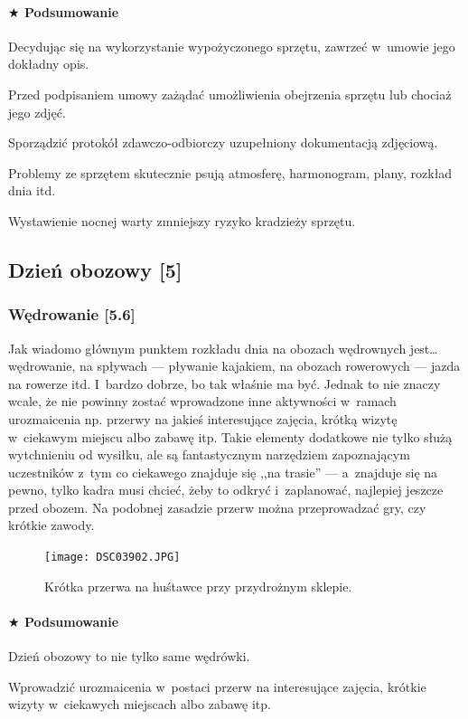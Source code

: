 \documentclass[a5paper,10pt,titlepage,twoside]{article}
\newcommand*{\thecheckbox}{\hss$\Box$} %
\newenvironment*{checklist}
{\list{}{%
\renewcommand*{\makelabel}[1]{\thecheckbox}}}
{\endlist}
\begin{document}
\paragraph{$\bigstar$ Podsumowanie}
\begin{checklist}
\item Decydując się na wykorzystanie wypożyczonego sprzętu, zawrzeć w~umowie jego dokładny opis.
\item Przed podpisaniem umowy zażądać umożliwienia obejrzenia sprzętu lub chociaż jego zdjęć.
\item Sporządzić protokół zdawczo-odbiorczy uzupełniony dokumentacją zdjęciową.
\item Problemy ze sprzętem skutecznie psują atmosferę, harmonogram, plany, rozkład dnia itd.
\item Wystawienie nocnej warty zmniejszy ryzyko kradzieży sprzętu.
\end{checklist}

\subsection{Dzień obozowy [5]}
\subsubsection{Wędrowanie [5.6]}
Jak wiadomo głównym punktem rozkładu dnia na obozach wędrownych jest\ldots węd\-rowanie, na spływach --- pływanie kajakiem, na obozach rowerowych --- jazda na rowerze itd. I~bardzo dobrze, bo tak właśnie ma być. Jednak to nie znaczy wcale, że nie powinny zostać wprowadzone inne aktywności w~ramach urozmaicenia np. przerwy na jakieś interesujące zajęcia, krótką wizytę w~ciekawym miejscu albo zabawę itp. Takie elementy dodatkowe nie tylko służą wytchnieniu od wysiłku, ale są fantastycznym narzędziem zapoznającym uczestników z~tym co ciekawego znajduje się ,,na trasie'' --- a~znajduje się na pewno, tylko kadra musi chcieć, żeby to odkryć i~zaplanować, najlepiej jeszcze przed obozem. Na podobnej zasadzie przerw można przeprowadzać gry, czy krótkie zawody.
\begin{figure}[htp]
\centering
\texttt{[image: DSC03902.JPG]}
\caption{Krótka przerwa na huśtawce przy przydrożnym sklepie.}\label{fig:hustawka}
\end{figure}

\paragraph{$\bigstar$ Podsumowanie}
\begin{checklist}
\item Dzień obozowy to nie tylko same wędrówki.
\item Wprowadzić urozmaicenia w~postaci przerw na interesujące zajęcia, krótkie wizyty w~ciekawych miejscach albo zabawę itp.
\end{checklist}
\end{document}
